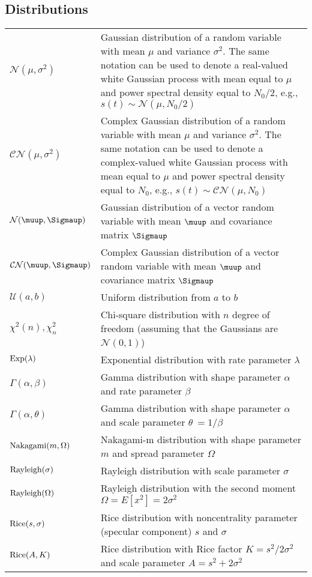 \documentclass{article}
\begin{document}
\subsection{Distributions}
\begin{xltabular}{\textwidth}{XX}
    \(\mathcal{N}(\mu, \sigma^2)\) & Gaussian distribution of a random variable with mean \(\mu\) and variance \(\sigma^{2}\). The same notation can be used to denote a real-valued white Gaussian process with mean equal to \(\mu\) and power spectral density equal to \(N_0/2\), e.g., \(s(t) \sim \mathcal{N}(\mu, N_0/2)\)\\
    \(\mathcal{CN}(\mu, \sigma^2)\) & Complex Gaussian distribution of a random variable with mean \(\mu\) and variance \(\sigma^{2}\). The same notation can be used to denote a complex-valued white Gaussian process with mean equal to \(\mu\) and power spectral density equal to \(N_0\), e.g., \(s(t) \sim \mathcal{CN}(\mu, N_0)\)\\
    \(\mathcal{N}(\boldsymbol{\muup}, \boldsymbol{\Sigmaup})\) & Gaussian distribution of a vector random variable with mean \(\boldsymbol{\muup}\) and covariance matrix \(\boldsymbol{\Sigmaup}\)\\
    \(\mathcal{CN}(\boldsymbol{\muup}, \boldsymbol{\Sigmaup})\) & Complex Gaussian distribution of a vector random variable with mean \(\boldsymbol{\muup}\) and covariance matrix \(\boldsymbol{\Sigmaup}\)\\
    \(\mathcal{U}(a,b)\) & Uniform distribution from \(a\) to \(b\)\\
    \(\chi^2 (n), \chi^2_n\) & Chi-square distribution with \(n\) degree of freedom (assuming that the Gaussians are \(\mathcal{N}(0,1)\))\\
    \(\textnormal{Exp}(\lambda)\) & Exponential distribution with rate parameter \(\lambda\)\\
    \(\Gamma(\alpha, \beta)\) & Gamma distribution with shape parameter \(\alpha\) and rate parameter \(\beta\)\\
    \(\Gamma(\alpha, \theta)\) & Gamma distribution with shape parameter \(\alpha\) and scale parameter \(\theta\ = 1/\beta\)\\
    \(\textnormal{Nakagami}(m, \Omega)\) & Nakagami-m distribution with shape parameter \(m\) and spread parameter \(\Omega\) \\
    \(\textnormal{Rayleigh}(\sigma)\) & Rayleigh distribution with scale parameter \(\sigma\)\\
    \(\textnormal{Rayleigh}(\Omega)\) & Rayleigh distribution with the second moment \(\Omega = E\left[ x^2 \right] = 2\sigma^2\)\\
    \(\textnormal{Rice}(s, \sigma)\) & Rice distribution with noncentrality parameter (specular component) \(s\) and \(\sigma\)\\
    \(\textnormal{Rice}(A, K)\) & Rice distribution with Rice factor \(K=s^2/2\sigma^2\) and scale parameter \(A = s^2 + 2\sigma^2\)
\end{xltabular}
\end{document}

